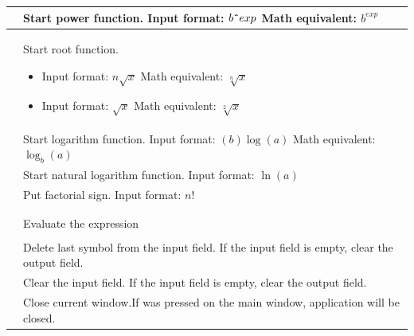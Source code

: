 \documentclass[a5paper, 11pt]{article}
\makeatletter
\def\setmenukeyswin{\def\tw@mk@os{win}}
\makeatother
\begin{document}
\begin{xltabular}{\textwidth}{
        >{\setmenukeyswin}c @{\hspace{3em}} 
        >{\renewcommand\cellalign{cl}}X}
        \keys{\^{}} & Start power function. \newline Input format: $b\texttt{\^{}}exp$ \newline Math equivalent: $b^{exp}$
        \\* \midrule
        
         & Start root function.
        \begin{itemize}[leftmargin=*]
            \item  Input format: $n \sqrt x$ \newline Math equivalent: $\sqrt[n]{x}$
            \item  Input format: $\sqrt x$ \newline Math equivalent: $\sqrt[2]{x}$
        \end{itemize}
        \\* \midrule
        
         & Start logarithm function. \newline Input format: $(b)\log(a)$ \newline Math equivalent: $\log_b(a)$
        \\* \midrule
        
         & Start natural logarithm function. \newline Input format: $\ln(a)$
        \\* \midrule
        
        \keys{!} & Put factorial sign. \newline Input format: $n!$
        \\* \midrule
        
        \\* \midrule
        
         & Evaluate the expression
        \\*
        \midrule
        
         & Delete last symbol from the input field. \newline If the input field is empty, clear the output field.
        \\*
        \midrule
        
         & Clear the input field. \newline If the input field is empty, clear the output field.
        \\* \midrule
        
        \keys{\esc} & Close current window.\newline If was pressed on the main window, application will be closed.
        \\*
    \end{xltabular}
    
\pagebreak
\end{document}
